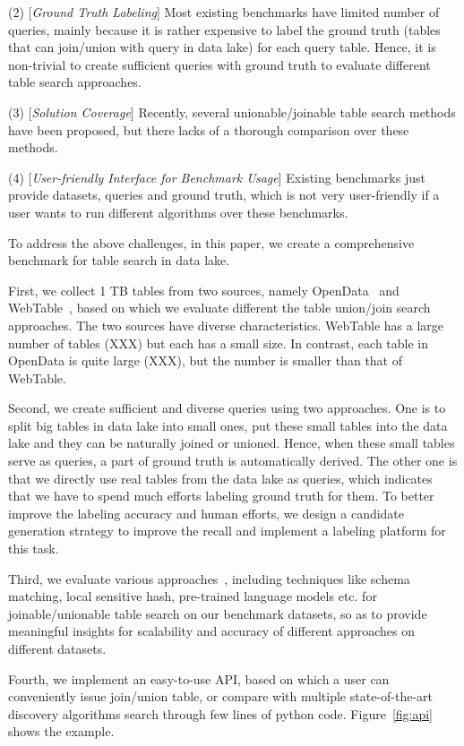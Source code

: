 \noindent (2) [\textit{Ground Truth Labeling}] 
 Most existing benchmarks have limited number of queries,  mainly because it is rather expensive to label the ground truth (tables  that can join/union with query in data lake) for each query table. Hence, it is non-trivial to create sufficient queries with ground truth to evaluate different table search approaches.

\noindent (3) [\textit{Solution Coverage}] 
Recently, several unionable/joinable table search methods have been proposed, but there lacks of a thorough comparison over these methods.

\noindent (4) [\textit{User-friendly Interface for Benchmark Usage}] Existing benchmarks just provide datasets, queries and ground truth, which is not very user-friendly if a user wants to
run different algorithms over these benchmarks.


To address the above challenges, in this paper, we create a comprehensive benchmark \sys for table search in data lake.

 First, we collect 1 TB tables from two sources, namely OpenData~\cite{} and  WebTable~\cite{}, based on which we evaluate different the table union/join search approaches. The two  sources have diverse characteristics. WebTable has a large number of tables (XXX) but each has a small size. In contrast, each table in OpenData is quite large (XXX), but the number is smaller than that of WebTable. 
 
 
Second, we create sufficient and diverse queries using two approaches. 
One is to split big tables in data lake into small ones, put these small tables into the data lake and they can be naturally joined or unioned. Hence, when these small tables serve as queries, a part of ground truth is automatically derived. 
The other one is that we directly use real tables from the data lake as queries, which indicates that we have to spend much efforts labeling ground truth for them.
To better improve the labeling accuracy and human efforts, we design a candidate generation strategy to improve the recall and implement a labeling platform for this task.   

Third, we evaluate various approaches~\cc{\cite{}}, including techniques like schema matching, local sensitive hash,  pre-trained language models etc. for joinable/unionable table search on our benchmark datasets, so as to provide meaningful insights for scalability and accuracy of different approaches on different datasets.

Fourth, we implement an easy-to-use API, based on which a user can conveniently 
 issue join/union table, or compare with multiple state-of-the-art discovery algorithms  search through few lines of python code. Figure~\ref{fig:api} shows the example.

